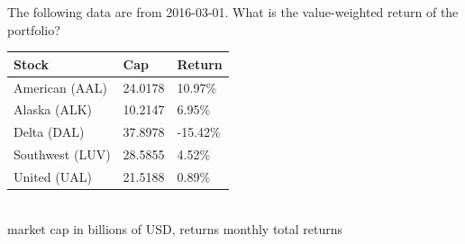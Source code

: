 The following data are from 2016-03-01. What is the value-weighted return of the portfolio?
\begin{center}
	\begin{tabular}{l|ll}
		\textbf{Stock} & \textbf{Cap} & \textbf{Return} \\ \hline
		American (AAL) & 24.0178 & 10.97\% \\
		Alaska (ALK) & 10.2147 & 6.95\% \\
		Delta (DAL) & 37.8978 & -15.42\% \\
		Southwest (LUV) & 28.5855 & 4.52\% \\
		United (UAL) & 21.5188 & 0.89\%\\\hline
	\end{tabular}\\
	{\footnotesize market cap in billions of USD, returns monthly total returns}
\end{center}

